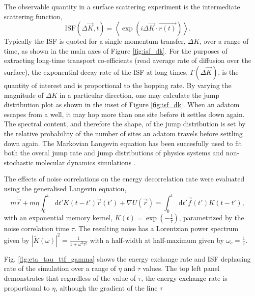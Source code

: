 \documentclass[7pt]{article}
\newcommand*{\diff}{\mathop{}\!\mathrm{d}}
\begin{document}
The observable quantity in a surface scattering experiment is the intermediate scattering function,
$$
\mathrm{ISF}(\Delta{\vec{K}}, t) = \left<\exp\left(i\Delta{\vec{K}}\cdot\vec{r(t)}\right)\right>.
$$
Typically the ISF is quoted for a single momentum transfer, $\Delta{K}$, over a range of time, as shown in the main axes of Figure \ref{fig:isf_dk}. For the purposes of extracting long-time transport co-efficients (read average rate of diffusion over the surface), the exponential decay rate of the ISF at long times, $\Gamma(\Delta{\vec{K}})$, is the quantity of interest and is proportional to the hopping rate\cite{Chudley}. By varying the magnitude of $\Delta{K}$ in a particular direction, one may calculate the jump distribution plot as shown in the inset of Figure \ref{fig:isf_dk}. When an adatom escapes from a well, it may hop more than one site before it settles down again. The spectral content, and therefore the shape, of the jump distribution is set by the relative probability of the number of sites an adatom travels before settling down again. The Markovian Langevin equation has been succesfully used to fit both the overal jump rate and jump distributions of physics systems \cite{Alexandrowicz, Hedgeland, Jardine} and non-stochastic molecular dynamics simulations \cite{Diamant}. 

The effects of noise correlations on the energy decorrelation rate were evaluated using the generalised Langevin equation,
\begin{equation}
	m\ddot{\vec{r}}+m\eta\int_0^t\diff{t'}K(t-t')\dot{\vec{r}}(t')+\nabla U(\vec{r})=\int_0^t\diff{t'}\vec{f}(t')K(t-t'),
	\label{eq:gle}
\end{equation}
with an exponential memory kernel, $K(t)=\exp(-\frac{t}{\tau})$, parametrized by the noise correlation time $\tau$. The resulting noise has a Lorentzian power spectrum given by $\left|\tilde{K}(\omega)\right|^2=\frac{1}{1+\omega^2\tau^2}$ with a half-width at half-maximum given by $\omega_c = \frac{1}{\tau}$.

Fig. \ref{fig:eta_tau_ttf_gamma} shows the energy exchange rate and ISF dephasing rate of the simulation over a range of $\eta$ and $\tau$ values. The top left panel demonstrates that regardless of the value of $\tau$, the energy exchange rate is proportional to $\eta$, although the gradient of the line  $\tau$
\end{document}
